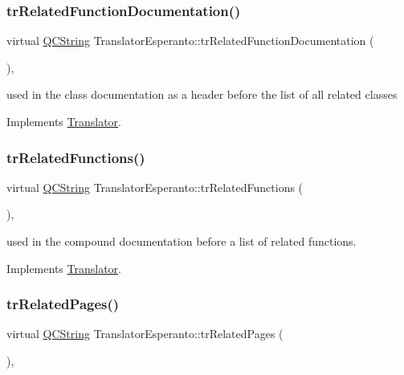 \subsubsection{\texorpdfstring{trRelatedFunctionDocumentation()}{trRelatedFunctionDocumentation()}}
{\footnotesize\ttfamily virtual \mbox{\hyperlink{class_q_c_string}{Q\+C\+String}} Translator\+Esperanto\+::tr\+Related\+Function\+Documentation (\begin{DoxyParamCaption}{ }\end{DoxyParamCaption})\hspace{0.3cm}{\ttfamily [inline]}, {\ttfamily [virtual]}}

used in the class documentation as a header before the list of all related classes 

Implements \mbox{\hyperlink{class_translator}{Translator}}.

\mbox{\label{class_translator_esperanto_a07f2ed82c85c638c9f43e084b260e050}} 
\subsubsection{\texorpdfstring{trRelatedFunctions()}{trRelatedFunctions()}}
{\footnotesize\ttfamily virtual \mbox{\hyperlink{class_q_c_string}{Q\+C\+String}} Translator\+Esperanto\+::tr\+Related\+Functions (\begin{DoxyParamCaption}{ }\end{DoxyParamCaption})\hspace{0.3cm}{\ttfamily [inline]}, {\ttfamily [virtual]}}

used in the compound documentation before a list of related functions. 

Implements \mbox{\hyperlink{class_translator}{Translator}}.

\mbox{\label{class_translator_esperanto_a24142866311df63cceb6e2a778dbd93d}} 
\subsubsection{\texorpdfstring{trRelatedPages()}{trRelatedPages()}}
{\footnotesize\ttfamily virtual \mbox{\hyperlink{class_q_c_string}{Q\+C\+String}} Translator\+Esperanto\+::tr\+Related\+Pages (\begin{DoxyParamCaption}{ }\end{DoxyParamCaption})\hspace{0.3cm}{\ttfamily [inline]}, {\ttfamily [virtual]}}

